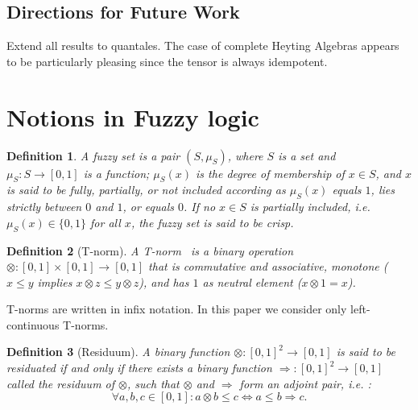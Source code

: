 \documentclass{article}
\def\ie{{\em i.e. }}
\newtheorem{definition}{Definition}[section]
\begin{document}
\subsection{Directions for Future Work}
Extend all results to quantales. The case of complete Heyting Algebras appears to be particularly pleasing since the tensor is always idempotent. 

\appendix
\section{Notions in Fuzzy logic}
\label{appendix}


\begin{definition}A \emph{fuzzy set} is a pair $(S, \mu_S)$, where $S$ is a set and
$\mu_S: S\rightarrow [0,1]$ is a function; $\mu_S(x)$ is the \emph{degree of membership}
of $x\in S$, and $x$ is said to be \emph{fully}, \emph{partially}, or \emph{not} included
according as $\mu_S(x)$ equals $1$, lies strictly between $0$ and $1$, or equals $0$.
If no $x\in S$ is partially included, \ie $\mu_S(x)\in\{0,1\}$ for all $x$, the fuzzy set is said to be {\em crisp}.
\end{definition}


\begin{definition}[T-norm]\label{T-norm}
A \emph{T-norm}~\cite{met05} is a binary operation
$\otimes:[0,1]\times[0,1]\to[0,1]$ that is commutative and associative, monotone
($x\le y$ implies $x\otimes z \le y\otimes z$), and has $1$ as neutral element
($x\otimes 1 = x$).
\end{definition}

\noindent T-norms are written in infix notation. In this paper we consider only
left-continuous T-norms.

\begin{definition}[Residuum] \label{residuum}A binary function $\otimes: [0,1]^2 \rightarrow [0, 1] $ is said to be residuated
if and only if there exists a binary function $\Rightarrow : [0, 1]^2 \rightarrow [0, 1]$ called the \emph{residuum of $\otimes$}, such
that $\otimes$ and $\Rightarrow$ form an adjoint pair, \ie:
\[\forall a,b, c\in [0,1] : a\otimes b \leq c \Leftrightarrow a \leq b \Rightarrow c .\]
\end{definition}
\end{document}

